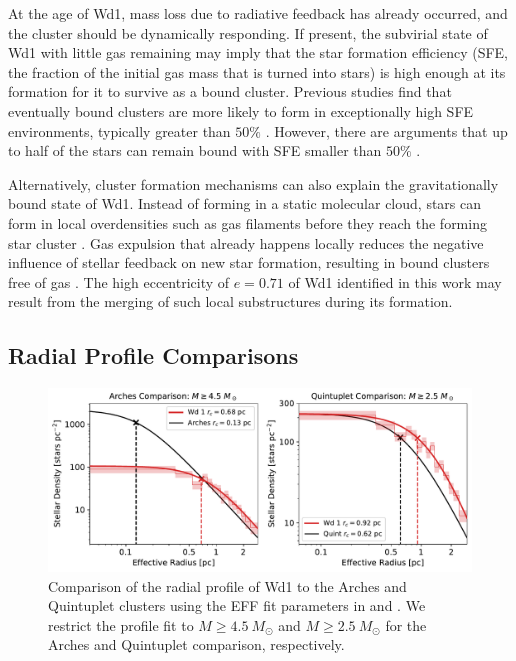 \documentclass[12pt]{ucsddissertation}
\begin{document}
\begin{CJK*}{UTF8}{gbsn}
At the age of Wd1, mass loss due to radiative feedback has already occurred, and the cluster should be dynamically responding. If present, the subvirial state of Wd1 with little gas remaining may imply that the star formation efficiency (SFE, the fraction of the initial gas mass that is turned into stars) is high enough at its formation for it to survive as a bound cluster. Previous studies find that eventually bound clusters are more likely to form in exceptionally high SFE environments, typically greater than $50\%$ \citep[][]{Geyer-2001, Li-2019}. However, there are arguments that up to half of the stars can remain bound with SFE smaller than $50\%$ \citep[][]{Boily-2003}.

Alternatively, cluster formation mechanisms can also explain the gravitationally bound state of Wd1. Instead of forming in a static molecular cloud, stars can form in local overdensities such as gas filaments before they reach the forming star cluster \citep[][]{Bonnell-2008, Longmore-2014, Wei-2024}. Gas expulsion that already happens locally reduces the negative influence of stellar feedback on new star formation, resulting in bound clusters free of gas \citep[][]{Kruijssen-2012, Krause-2020, Chevance-2023}. The high eccentricity of $e=0.71$ of Wd1 identified in this work may result from the merging of such local substructures during its formation.



\subsection{Radial Profile Comparisons}
\label{wd1-subsec:arches_quint}

\begin{figure}[htb!]
\centering \includegraphics[width=\linewidth]{figures/chapter2/arches_quint_comparison_sub_b.pdf}
\caption[Comparison of the Westerlund 1 radial density profile to the Arches and Quintuplet]{Comparison of the radial profile of Wd1 to the Arches and Quintuplet clusters using the EFF fit parameters in \citet{Hosek-2015} and \citet{Rui-2019}. We restrict the profile fit to $M \geq 4.5~M_\odot$ and $M \geq 2.5~M_\odot$ for the Arches and Quintuplet comparison, respectively.}
\label{fig:arches_quint_radial_profile_comparison}
\end{figure}



\end{CJK*}
\end{document}
